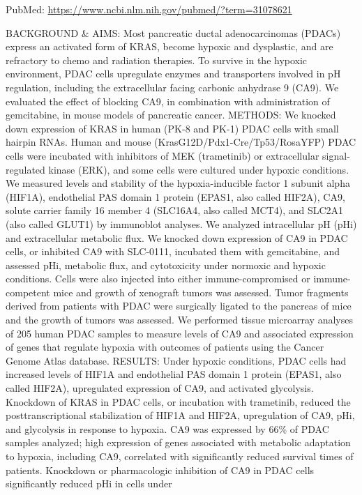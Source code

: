 \documentclass[]{article}
\begin{document}
PubMed: \url{https://www.ncbi.nlm.nih.gov/pubmed/?term=31078621}

BACKGROUND \& AIMS: Most pancreatic ductal adenocarcinomas (PDACs)
express an activated form of KRAS, become hypoxic and dysplastic, and
are refractory to chemo and radiation therapies. To survive in the
hypoxic environment, PDAC cells upregulate enzymes and transporters
involved in pH regulation, including the extracellular facing carbonic
anhydrase 9 (CA9). We evaluated the effect of blocking CA9, in
combination with administration of gemcitabine, in mouse models of
pancreatic cancer. METHODS: We knocked down expression of KRAS in human
(PK-8 and PK-1) PDAC cells with small hairpin RNAs. Human and mouse
(KrasG12D/Pdx1-Cre/Tp53/RosaYFP) PDAC cells were incubated with
inhibitors of MEK (trametinib) or extracellular signal-regulated kinase
(ERK), and some cells were cultured under hypoxic conditions. We
measured levels and stability of the hypoxia-inducible factor 1 subunit
alpha (HIF1A), endothelial PAS domain 1 protein (EPAS1, also called
HIF2A), CA9, solute carrier family 16 member 4 (SLC16A4, also called
MCT4), and SLC2A1 (also called GLUT1) by immunoblot analyses. We
analyzed intracellular pH (pHi) and extracellular metabolic flux. We
knocked down expression of CA9 in PDAC cells, or inhibited CA9 with
SLC-0111, incubated them with gemcitabine, and assessed pHi, metabolic
flux, and cytotoxicity under normoxic and hypoxic conditions. Cells were
also injected into either immune-compromised or immune-competent mice
and growth of xenograft tumors was assessed. Tumor fragments derived
from patients with PDAC were surgically ligated to the pancreas of mice
and the growth of tumors was assessed. We performed tissue microarray
analyses of 205 human PDAC samples to measure levels of CA9 and
associated expression of genes that regulate hypoxia with outcomes of
patients using the Cancer Genome Atlas database. RESULTS: Under hypoxic
conditions, PDAC cells had increased levels of HIF1A and endothelial PAS
domain 1 protein (EPAS1, also called HIF2A), upregulated expression of
CA9, and activated glycolysis. Knockdown of KRAS in PDAC cells, or
incubation with trametinib, reduced the posttranscriptional
stabilization of HIF1A and HIF2A, upregulation of CA9, pHi, and
glycolysis in response to hypoxia. CA9 was expressed by 66\% of PDAC
samples analyzed; high expression of genes associated with metabolic
adaptation to hypoxia, including CA9, correlated with significantly
reduced survival times of patients. Knockdown or pharmacologic
inhibition of CA9 in PDAC cells significantly reduced pHi in cells under
\end{document}
